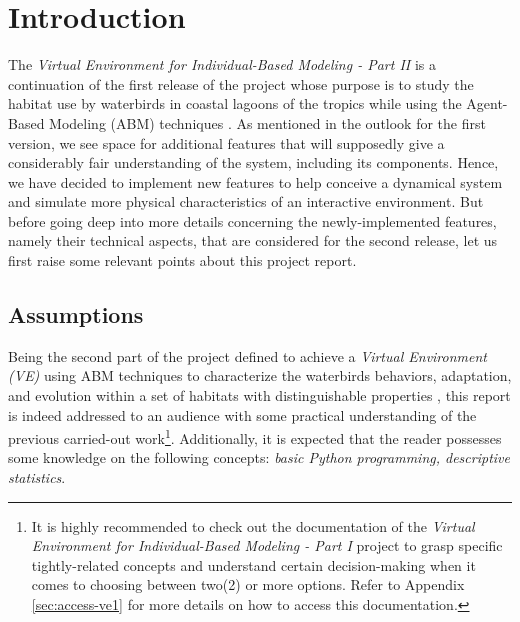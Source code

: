 %
%
%


\section{Introduction}
The \emph{Virtual Environment for Individual-Based Modeling - Part II} is a continuation of the first release of the project whose purpose is to study the habitat use by waterbirds in coastal lagoons of the tropics while using the Agent-Based Modeling (ABM) techniques \cite{rflorent2019veibm1}. As mentioned in the outlook for the first version, we see space for additional features that will supposedly give a considerably fair understanding of the system, including its components. Hence, we have decided to implement new features to help conceive a dynamical system and simulate more physical characteristics of an interactive environment. But before going deep into more details concerning the newly-implemented features, namely their technical aspects, that are considered for the second release, let us first raise some relevant points about this project report.

\subsection{Assumptions}
Being the second part of the project defined to achieve a \emph{Virtual Environment (VE)} using ABM techniques to characterize the waterbirds behaviors, adaptation, and evolution within a set of habitats with distinguishable properties \cite{rflorent2019veibm1}, this report is indeed addressed to an audience with some practical understanding of the previous carried-out work\footnote{It is highly recommended to check out the documentation of the \emph{Virtual Environment for Individual-Based Modeling - Part I} project to grasp specific tightly-related concepts and understand certain decision-making when it comes to choosing between two(2) or more options. Refer to Appendix \ref{sec:access-ve1} for more details on how to access this documentation.}. Additionally, it is expected that the reader possesses some knowledge on the following concepts: \emph{basic Python programming, descriptive statistics}.


